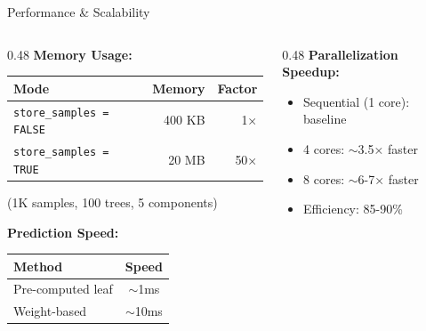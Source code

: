 \documentclass[aspectratio=169]{beamer}
\begin{document}
\begin{frame}{Performance & Scalability}

\begin{columns}[T]

\begin{column}{0.48\textwidth}
\textbf{Memory Usage:}

\begin{table}
\tiny
\begin{tabular}{lrr}
\toprule
\textbf{Mode} & \textbf{Memory} & \textbf{Factor} \\
\midrule
\texttt{store\_samples = FALSE} & 400 KB & 1× \\
\texttt{store\_samples = TRUE} & 20 MB & 50× \\
\bottomrule
\end{tabular}
\end{table}

\vspace{0.1cm}
\tiny{(1K samples, 100 trees, 5 components)}

\vspace{0.3cm}

\textbf{Prediction Speed:}

\begin{table}
\tiny
\begin{tabular}{lc}
\toprule
\textbf{Method} & \textbf{Speed} \\
\midrule
Pre-computed leaf & $\sim$1ms \\
Weight-based & $\sim$10ms \\
\bottomrule
\end{tabular}
\end{table}

\end{column}

\begin{column}{0.48\textwidth}
\textbf{Parallelization Speedup:}

\begin{itemize}
\item Sequential (1 core): baseline
\item 4 cores: $\sim$3.5× faster
\item 8 cores: $\sim$6-7× faster
\item Efficiency: 85-90\%
\end{itemize}


\end{column}
\end{columns}
\end{frame}
\end{document}
